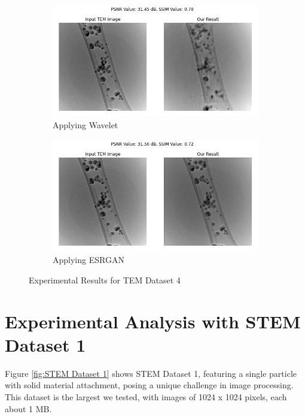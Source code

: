 \begin{figure}[H]
    \begin{subfigure}{.47\textwidth} %
        \includegraphics[width=\textwidth]{img/Results/Dataset_4/Dataset_4_wavelet.jpg}
        \caption{Applying Wavelet}
        \label{fig:Image5}
    \end{subfigure}
    \hfill
    \begin{subfigure}{.47\textwidth} %
        \includegraphics[width=\textwidth]{img/Results/Dataset_4/Dataset_4_ESRGAN.jpg}
        \caption{Applying ESRGAN}
        \label{fig:TEM_Dataset_4_Image5}
    \end{subfigure}
    \caption{Experimental Results for TEM Dataset 4}
    \label{fig:TEM_Dataset_4_Results}
\end{figure}


\clearpage
\section{Experimental Analysis with STEM Dataset 1}
Figure \ref{fig:STEM Dataset 1} shows STEM Dataset 1, featuring a single particle with solid material attachment, posing a unique challenge in image processing. This dataset is the largest we tested, with images of 1024 x 1024 pixels, each about 1 MB.

